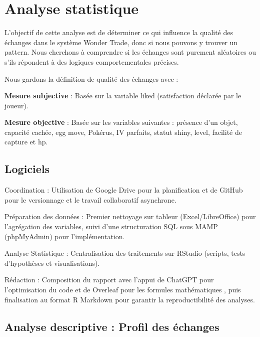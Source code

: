 \documentclass[mstat,12pt]{unswthesis}
\begin{document}
\bigskip

\chapter{Analyse statistique}\label{analyse-statistique}

L'objectif de cette analyse est de déterminer ce qui influence la
qualité des échanges dans le système Wonder Trade, donc si nous pouvons
y trouver un pattern. Nous cherchons à comprendre si les échanges sont
purement aléatoires ou s'ils répondent à des logiques comportementales
précises.

\medskip

Nous gardons la définition de qualité des échanges avec :

\textbf{Mesure subjective} : Basée sur la variable liked (satisfaction
déclarée par le joueur).

\medskip

\textbf{Mesure objective} : Basée sur les variables suivantes : présence
d'un objet, capacité cachée, egg move, Pokérus, IV parfaits, statut
shiny, level, facilité de capture et hp.

\section{Logiciels}\label{logiciels}

Coordination : Utilisation de Google Drive pour la planification et de
GitHub pour le versionnage et le travail collaboratif asynchrone.

Préparation des données : Premier nettoyage sur tableur
(Excel/LibreOffice) pour l'agrégation des variables, suivi d'une
structuration SQL sous MAMP (phpMyAdmin) pour l'implémentation.

Analyse Statistique : Centralisation des traitements sur RStudio
(scripts, tests d'hypothèses et visualisations).

Rédaction : Composition du rapport avec l'appui de ChatGPT pour
l'optimisation du code et de Overleaf pour les formules mathématiques ,
puis finalisation au format R Markdown pour garantir la reproductibilité
des analyses.

\bigskip

\section{Analyse descriptive : Profil des
échanges}\label{analyse-descriptive-profil-des-uxe9changes}
\end{document}
